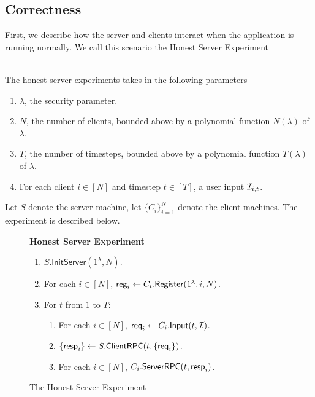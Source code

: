 \subsection{Correctness}
\label{subsec:messaging-correctness}
First, we describe how the server and clients interact when the application is running normally. We call this scenario the Honest Server Experiment

\begin{definition}  \hfill\\
\label{defn:messaging-honest-server-experiment}
The honest server experiments takes in the following parameters

\begin{enumerate}
    \item $\lambda$, the security parameter.
    \item $N$, the number of clients, bounded above by a polynomial function $N(\lambda)$ of $\lambda$.
    \item $T$, the number of timesteps, bounded above by a polynomial function $T(\lambda)$ of $\lambda$.
    \item For each client $i \in [N]$ and timestep $t \in [T]$, a user input $\mathcal{I}_{i, t}$.
\end{enumerate}

Let $S$ denote the server machine, let $\{C_i\}_{i = 1}^N$ denote the client machines. The experiment is described below.
\begin{figure}[ht!]
\begin{framed}
\textbf{Honest Server Experiment}
\begin{enumerate}
\item $S.\mathsf{InitServer}(1^{\lambda}, N)$. 
\item For each $i \in [N]$, $\mathsf{reg}_i \leftarrow C_i.\mathsf{Register}(1^{\lambda}, i, N)$. 
\item For $t$ from $1$ to $T$:
    \begin{enumerate}
    \item For each $i \in [N]$, $\mathsf{req}_i \leftarrow C_i.\mathsf{Input}(t, \mathcal{I})$.
    
    \item $\{\mathsf{resp}_i\} \leftarrow S.\mathsf{ClientRPC}(t, \{\mathsf{req}_i\})$.
    
    \item For each $i \in [N]$, $C_i.\mathsf{ServerRPC}(t, \mathsf{resp}_i)$.
    \end{enumerate}
\end{enumerate}
\end{framed}
\label{expr:messaging-honest-server}
\caption{The Honest Server Experiment}
\end{figure}

\end{definition}

